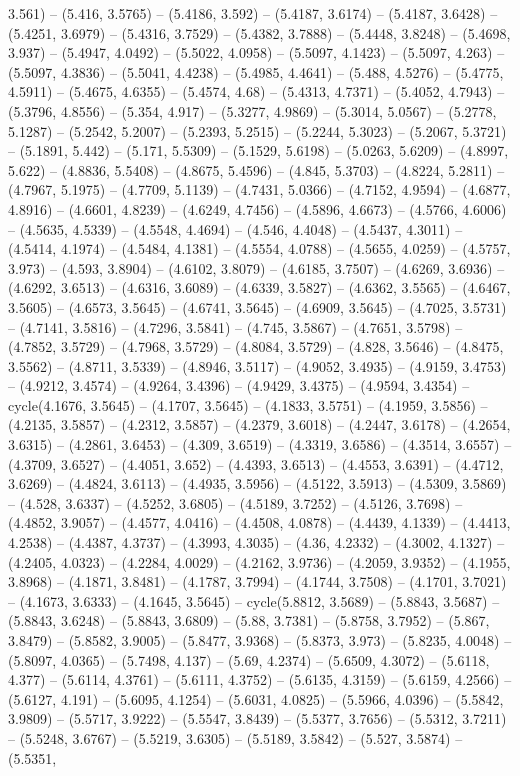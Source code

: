 3.561) -- (5.416, 3.5765) -- (5.4186, 3.592) -- (5.4187, 3.6174) -- (5.4187, 3.6428) -- (5.4251, 3.6979) -- (5.4316, 3.7529) -- (5.4382, 3.7888) -- (5.4448, 3.8248) -- (5.4698, 3.937) -- (5.4947, 4.0492) -- (5.5022, 4.0958) -- (5.5097, 4.1423) -- (5.5097, 4.263) -- (5.5097, 4.3836) -- (5.5041, 4.4238) -- (5.4985, 4.4641) -- (5.488, 4.5276) -- (5.4775, 4.5911) -- (5.4675, 4.6355) -- (5.4574, 4.68) -- (5.4313, 4.7371) -- (5.4052, 4.7943) -- (5.3796, 4.8556) -- (5.354, 4.917) -- (5.3277, 4.9869) -- (5.3014, 5.0567) -- (5.2778, 5.1287) -- (5.2542, 5.2007) -- (5.2393, 5.2515) -- (5.2244, 5.3023) -- (5.2067, 5.3721) -- (5.1891, 5.442) -- (5.171, 5.5309) -- (5.1529, 5.6198) -- (5.0263, 5.6209) -- (4.8997, 5.622) -- (4.8836, 5.5408) -- (4.8675, 5.4596) -- (4.845, 5.3703) -- (4.8224, 5.2811) -- (4.7967, 5.1975) -- (4.7709, 5.1139) -- (4.7431, 5.0366) -- (4.7152, 4.9594) -- (4.6877, 4.8916) -- (4.6601, 4.8239) -- (4.6249, 4.7456) -- (4.5896, 4.6673) -- (4.5766, 4.6006) -- (4.5635, 4.5339) -- (4.5548, 4.4694) -- (4.546, 4.4048) -- (4.5437, 4.3011) -- (4.5414, 4.1974) -- (4.5484, 4.1381) -- (4.5554, 4.0788) -- (4.5655, 4.0259) -- (4.5757, 3.973) -- (4.593, 3.8904) -- (4.6102, 3.8079) -- (4.6185, 3.7507) -- (4.6269, 3.6936) -- (4.6292, 3.6513) -- (4.6316, 3.6089) -- (4.6339, 3.5827) -- (4.6362, 3.5565) -- (4.6467, 3.5605) -- (4.6573, 3.5645) -- (4.6741, 3.5645) -- (4.6909, 3.5645) -- (4.7025, 3.5731) -- (4.7141, 3.5816) -- (4.7296, 3.5841) -- (4.745, 3.5867) -- (4.7651, 3.5798) -- (4.7852, 3.5729) -- (4.7968, 3.5729) -- (4.8084, 3.5729) -- (4.828, 3.5646) -- (4.8475, 3.5562) -- (4.8711, 3.5339) -- (4.8946, 3.5117) -- (4.9052, 3.4935) -- (4.9159, 3.4753) -- (4.9212, 3.4574) -- (4.9264, 3.4396) -- (4.9429, 3.4375) -- (4.9594, 3.4354) -- cycle(4.1676, 3.5645) -- (4.1707, 3.5645) -- (4.1833, 3.5751) -- (4.1959, 3.5856) -- (4.2135, 3.5857) -- (4.2312, 3.5857) -- (4.2379, 3.6018) -- (4.2447, 3.6178) -- (4.2654, 3.6315) -- (4.2861, 3.6453) -- (4.309, 3.6519) -- (4.3319, 3.6586) -- (4.3514, 3.6557) -- (4.3709, 3.6527) -- (4.4051, 3.652) -- (4.4393, 3.6513) -- (4.4553, 3.6391) -- (4.4712, 3.6269) -- (4.4824, 3.6113) -- (4.4935, 3.5956) -- (4.5122, 3.5913) -- (4.5309, 3.5869) -- (4.528, 3.6337) -- (4.5252, 3.6805) -- (4.5189, 3.7252) -- (4.5126, 3.7698) -- (4.4852, 3.9057) -- (4.4577, 4.0416) -- (4.4508, 4.0878) -- (4.4439, 4.1339) -- (4.4413, 4.2538) -- (4.4387, 4.3737) -- (4.3993, 4.3035) -- (4.36, 4.2332) -- (4.3002, 4.1327) -- (4.2405, 4.0323) -- (4.2284, 4.0029) -- (4.2162, 3.9736) -- (4.2059, 3.9352) -- (4.1955, 3.8968) -- (4.1871, 3.8481) -- (4.1787, 3.7994) -- (4.1744, 3.7508) -- (4.1701, 3.7021) -- (4.1673, 3.6333) -- (4.1645, 3.5645) -- cycle(5.8812, 3.5689) -- (5.8843, 3.5687) -- (5.8843, 3.6248) -- (5.8843, 3.6809) -- (5.88, 3.7381) -- (5.8758, 3.7952) -- (5.867, 3.8479) -- (5.8582, 3.9005) -- (5.8477, 3.9368) -- (5.8373, 3.973) -- (5.8235, 4.0048) -- (5.8097, 4.0365) -- (5.7498, 4.137) -- (5.69, 4.2374) -- (5.6509, 4.3072) -- (5.6118, 4.377) -- (5.6114, 4.3761) -- (5.6111, 4.3752) -- (5.6135, 4.3159) -- (5.6159, 4.2566) -- (5.6127, 4.191) -- (5.6095, 4.1254) -- (5.6031, 4.0825) -- (5.5966, 4.0396) -- (5.5842, 3.9809) -- (5.5717, 3.9222) -- (5.5547, 3.8439) -- (5.5377, 3.7656) -- (5.5312, 3.7211) -- (5.5248, 3.6767) -- (5.5219, 3.6305) -- (5.5189, 3.5842) -- (5.527, 3.5874) -- (5.5351, 